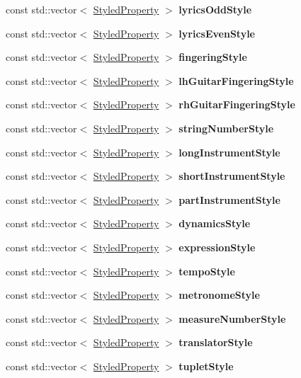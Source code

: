 \begin{DoxyCompactItemize}
const std\+::vector$<$ \hyperlink{struct_ms_1_1_styled_property}{Styled\+Property} $>$ {\bfseries lyrics\+Odd\+Style}
\item 
const std\+::vector$<$ \hyperlink{struct_ms_1_1_styled_property}{Styled\+Property} $>$ {\bfseries lyrics\+Even\+Style}
\item 
const std\+::vector$<$ \hyperlink{struct_ms_1_1_styled_property}{Styled\+Property} $>$ {\bfseries fingering\+Style}
\item 
const std\+::vector$<$ \hyperlink{struct_ms_1_1_styled_property}{Styled\+Property} $>$ {\bfseries lh\+Guitar\+Fingering\+Style}
\item 
const std\+::vector$<$ \hyperlink{struct_ms_1_1_styled_property}{Styled\+Property} $>$ {\bfseries rh\+Guitar\+Fingering\+Style}
\item 
const std\+::vector$<$ \hyperlink{struct_ms_1_1_styled_property}{Styled\+Property} $>$ {\bfseries string\+Number\+Style}
\item 
const std\+::vector$<$ \hyperlink{struct_ms_1_1_styled_property}{Styled\+Property} $>$ {\bfseries long\+Instrument\+Style}
\item 
const std\+::vector$<$ \hyperlink{struct_ms_1_1_styled_property}{Styled\+Property} $>$ {\bfseries short\+Instrument\+Style}
\item 
const std\+::vector$<$ \hyperlink{struct_ms_1_1_styled_property}{Styled\+Property} $>$ {\bfseries part\+Instrument\+Style}
\item 
const std\+::vector$<$ \hyperlink{struct_ms_1_1_styled_property}{Styled\+Property} $>$ {\bfseries dynamics\+Style}
\item 
const std\+::vector$<$ \hyperlink{struct_ms_1_1_styled_property}{Styled\+Property} $>$ {\bfseries expression\+Style}
\item 
const std\+::vector$<$ \hyperlink{struct_ms_1_1_styled_property}{Styled\+Property} $>$ {\bfseries tempo\+Style}
\item 
const std\+::vector$<$ \hyperlink{struct_ms_1_1_styled_property}{Styled\+Property} $>$ {\bfseries metronome\+Style}
\item 
const std\+::vector$<$ \hyperlink{struct_ms_1_1_styled_property}{Styled\+Property} $>$ {\bfseries measure\+Number\+Style}
\item 
const std\+::vector$<$ \hyperlink{struct_ms_1_1_styled_property}{Styled\+Property} $>$ {\bfseries translator\+Style}
\item 
const std\+::vector$<$ \hyperlink{struct_ms_1_1_styled_property}{Styled\+Property} $>$ {\bfseries tuplet\+Style}

\end{DoxyCompactItemize}

